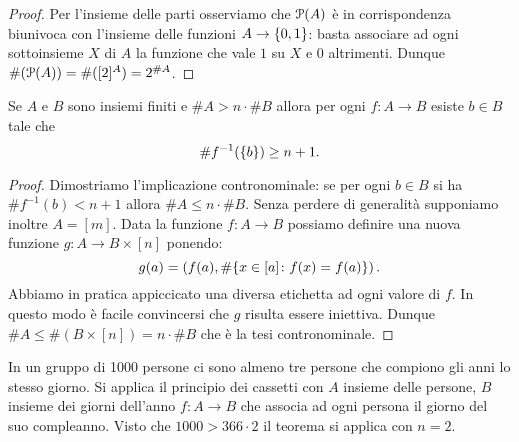 \begin{proof}
Per l'insieme delle parti osserviamo che $\P(A)$ è in corrispondenza biunivoca con
l'insieme delle funzioni $A\to \ENCLOSE{0,1}$: basta associare ad ogni sottoinsieme $X$ di $A$ 
la funzione che vale $1$ su $X$ e $0$ altrimenti. 
Dunque $\#(\P(A)) = \#([2]^A) = 2^{\#A}$.
\end{proof}

\begin{theorem}
Se $A$ e $B$ sono insiemi finiti e $\#A > n\cdot \#B$ allora 
per ogni $f\colon A \to B$ esiste $b\in B$ tale che 
\[
 \# f^{-1}(\ENCLOSE{b}) \ge n+1.
\]
\end{theorem}
\begin{proof}
Dimostriamo l'implicazione contronominale: se per ogni $b\in B$ si ha $\# f^{-1}(b) < n+1$
allora $\#A \le n\cdot \#B$.
Senza perdere di generalità supponiamo inoltre $A=[m]$.
Data la funzione $f\colon A\to B$ possiamo definire una nuova funzione $g\colon A\to B\times[n]$ 
ponendo:
\[
  g(a) = \left(f(a),\# \ENCLOSE{x\in [a]\colon f(x)=f(a)}\right).
\]
Abbiamo in pratica appiccicato una diversa etichetta ad ogni valore di $f$. 
In questo modo è facile convincersi che $g$ risulta essere iniettiva.
Dunque $\#A \le \#(B\times [n]) = n\cdot \# B$ che è la tesi contronominale.
\end{proof}

\begin{example}
In un gruppo di 1000 persone ci sono almeno tre persone che compiono gli anni lo stesso giorno.
Si applica il principio dei cassetti con $A$ insieme delle persone, 
$B$ insieme dei giorni dell'anno $f\colon A\to B$ che associa ad ogni persona il giorno
del suo compleanno. Visto che $1000 > 366 \cdot 2$ il teorema si applica con $n=2$.
\end{example}


